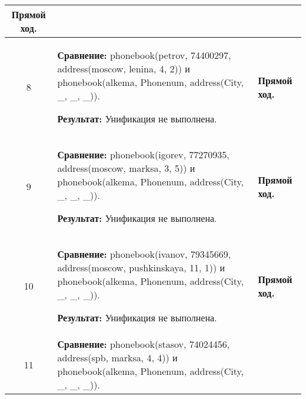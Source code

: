 \begin{longtable}{|c|p{}|p{}|}
    \textbf{Прямой ход.}
                       \\ \hline

    8
                       &
\textbf{Сравнение:} \newline
  phonebook(petrov, 74400297,
            address(moscow,    lenina,       4,  2))
    \newline и \newline
    phonebook(alkema, Phonenum, address(City, \_, \_, \_)).
    \newline

    \textbf{Результат:} \newline
    Унификация не выполнена.
                       &
    \textbf{Прямой ход.}
                       \\ \hline

    9
                       &
\textbf{Сравнение:} \newline
  phonebook(igorev, 77270935,
            address(moscow,    marksa,       3,  5))
    \newline и \newline
    phonebook(alkema, Phonenum, address(City, \_, \_, \_)).
    \newline

    \textbf{Результат:} \newline
    Унификация не выполнена.
                       &
    \textbf{Прямой ход.}
                       \\ \hline

    10
                       &
\textbf{Сравнение:} \newline
  phonebook(ivanov, 79345669,
            address(moscow,    pushkinskaya, 11, 1))
    \newline и \newline
    phonebook(alkema, Phonenum, address(City, \_, \_, \_)).
    \newline

    \textbf{Результат:} \newline
    Унификация не выполнена.
                       &
    \textbf{Прямой ход.}
                       \\ \hline

    11
                       &
\textbf{Сравнение:} \newline
  phonebook(stasov, 74024456,
            address(spb,       marksa,       4,  4))
    \newline и \newline
    phonebook(alkema, Phonenum, address(City, \_, \_, \_)).
    \newline


\end{longtable}
